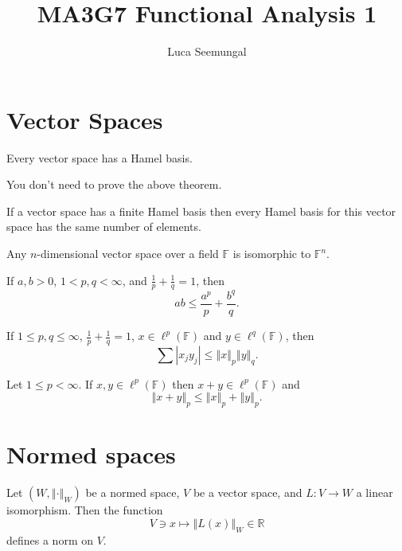 \documentclass[a4paper]{article}
\title{MA3G7 Functional Analysis 1}
\author{Luca Seemungal}
\newcommand{\F}{\mathbb{F}}
\newcommand{\R}{\mathbb{R}}
\newcommand{\norm}[1]{\left\Vert #1 \right\Vert}
\newcommand{\oneover}[1]{\frac{1}{#1}}
\newcommand{\<}{\langle}
\renewcommand{\>}{\rangle}
\begin{document}
\maketitle
\tableofcontents

\section{Vector Spaces}

\begin{thm}
  Every vector space has a Hamel basis.
\end{thm}

You don't need to prove the above theorem.

\begin{thm}
  If a vector space has a finite Hamel basis then every Hamel basis for this vector space has the same number of elements.
\end{thm}

\begin{prop}
  Any $n$-dimensional vector space over a field $\F$ is isomorphic to $\F^n$.
\end{prop}

\begin{lemma}
  If $a,b>0$, $1<p,q<\infty$, and $\frac{1}{p} + \frac{1}{q} = 1$, then
  $$ ab \leq \frac{a^p}{p} + \frac{b^q}{q}.$$
\end{lemma}

\begin{lemma}
  If $1\leq p,q\leq\infty$, $\oneover{p} + \oneover{q} = 1$, $x\in\ell^p(\F)$ and $y\in\ell^q(\F)$, then
  $$\sum |x_jy_j| \leq \norm{x}_p\norm{y}_q.$$
\end{lemma}

\begin{lemma}
  Let $1\leq p<\infty$. If $x,y\in\ell^p(\F)$ then $x+y\in\ell^p(\F)$ and
  $$\norm{x+y}_p \leq \norm{x}_p + \norm{y}_p.$$
\end{lemma}

\section{Normed spaces}

\begin{prop}
  Let $(W,\norm{\cdot}_W)$ be a normed space, $V$ be a vector space, and $L:V\to W$ a linear isomorphism. Then the function
  $$V\ni x\mapsto \norm{L(x)}_W \in\R$$
  defines a norm on $V$.
\end{prop}
\end{document}
